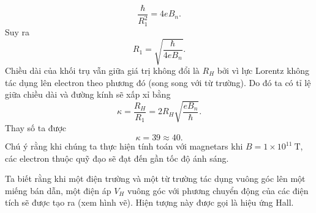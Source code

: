 \begin{loigiai}
\begin{enumerate}[1) ]
    \[\dfrac{\hbar}{R_1^2}=4eB_{n}.\]
    Suy ra
    \[R_1=\sqrt{\dfrac{\hbar}{4eB_{n}}}.\]
    Chiều dài của khối trụ vẫn giữa giá trị không đổi là $R_{H}$ bởi vì lực Lorentz không tác dụng lên electron theo phương đó (song song với từ trường). Do đó ta có tỉ lệ giữa chiều dài và đường kính sẽ xấp xỉ bằng
    \[\kappa=\dfrac{R_{H}}{R_1}=2R_{H}\sqrt{\dfrac{eB_{n}}{\hbar}}.\]
    Thay số ta được
    \[\kappa=39\approx 40.\]
    Chú ý rằng khi chúng ta thực hiện tính toán với magnetars khi $B=1\times10^{11}~\mathrm{T}$, các electron thuộc quỹ đạo sẽ đạt đến gần tốc độ ánh sáng.
\end{enumerate}
\end{loigiai}


\begin{vd}
Ta biết rằng khi một điện trường và một từ trường tác dụng vuông góc lên một miếng bán dẫn, một điện áp $V_{H}$ vuông góc với phương chuyển động của các điện tích sẽ được tạo ra (xem hình vẽ). Hiện tượng này được gọi là hiệu ứng Hall.


\begin{center}


\end{center}
\end{vd}
